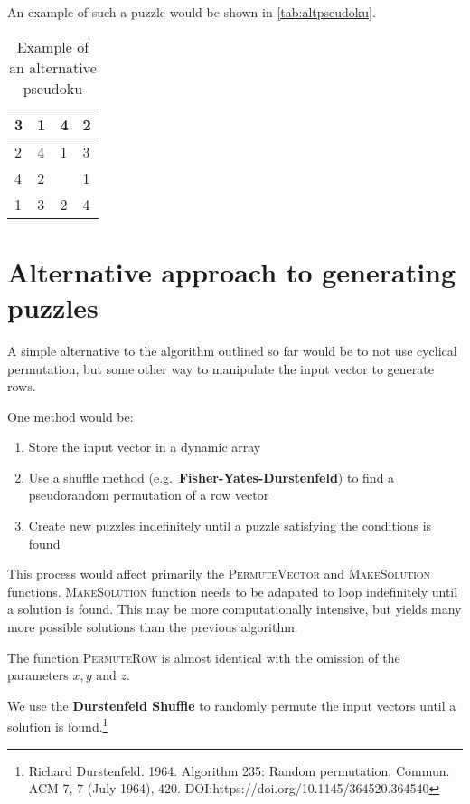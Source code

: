 An example of such a puzzle would be shown in \autoref{tab:altpseudoku}.

\begin{table}[H]
	\centering
	\begin{tabular}{|l|l|l|l|}
	\hline
	3 & 1 & 4 & 2 \\ \hline
	2 & 4 & 1 & 3 \\ \hline
	4 & 2 &  & 1 \\ \hline
	1 & 3 & 2 & 4 \\ \hline
	\end{tabular}
	\caption{Example of an alternative pseudoku}\label{tab:altpseudoku}
	\end{table}

\section{Alternative approach to generating puzzles}
A simple alternative to the algorithm outlined so far would be to not use cyclical permutation, but some other way to manipulate the input vector to generate rows.

One method would be:
\begin{enumerate}
	\item Store the input vector in a dynamic array
	\item Use a shuffle method (e.g.\ \textbf{Fisher-Yates-Durstenfeld}) to find a pseudorandom permutation of a row vector
	\item Create new puzzles indefinitely until a puzzle satisfying the conditions is found
\end{enumerate}
This process would affect primarily the \textsc{PermuteVector} and \textsc{MakeSolution} functions. \textsc{MakeSolution} function needs to be adapated to loop indefinitely until a solution is found. This may be more computationally intensive, but yields many more possible solutions than the previous algorithm.

The function \textsc{PermuteRow} is almost identical with the omission of the parameters \( x, y \) and \( z \).

We use the \textbf{Durstenfeld Shuffle} to randomly permute the input vectors until a solution is found.\footnote{Richard Durstenfeld. 1964. Algorithm 235: Random permutation. Commun. ACM 7, 7 (July 1964), 420. DOI:https://doi.org/10.1145/364520.364540}

